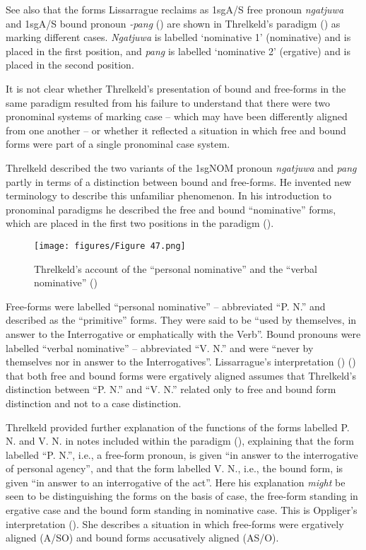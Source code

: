 See also that the forms Lissarrague reclaims as 1sgA/S free pronoun \textit{ngatjuwa} and 1sgA/S bound pronoun \textit{-pang} () are shown in Threlkeld’s paradigm () as marking different cases. \textit{Ngatjuwa} is labelled `nominative 1' (nominative) and is placed in the first position, and \textit{pang} is labelled `nominative 2' (ergative) and is placed in the second position.

It is not clear whether Threlkeld’s presentation of bound and free-forms in the same paradigm resulted from his failure to understand that there were two pronominal systems of marking case – which may have been differently aligned from one another – or whether it reflected a situation in which free and bound forms were part of a single pronominal case system. 



\largerpage
Threlkeld described the two variants of the 1sgNOM pronoun \textit{ngatjuwa} and \textit{pang} partly in terms of a distinction between bound and free-forms. He invented new terminology to describe this unfamiliar phenomenon. In his introduction to pronominal paradigms he described the free and bound “nominative” forms, which are placed in the first two positions in the paradigm ().
\begin{figure}
\texttt{[image: figures/Figure 47.png]}
\caption{\label{fig:3:47} Threlkeld’s account of the “personal nominative” and the “verbal nominative” (\citeyear[18]{threlkeld_australian_1834})}
\end{figure}


Free-forms were labelled ``personal nominative'' – abbreviated ``P. N.'' and described as the ``primitive'' forms. They were said to be ``used by themselves, in answer to the Interrogative or emphatically with the Verb''. Bound pronouns were labelled ``verbal nominative'' – abbreviated ``V. N.'' and were ``never by themselves nor in answer to the Interrogatives''. Lissarrague’s interpretation (\citeyear[39--46]{lissarrague_salvage_2006}) () that both free and bound forms were ergatively aligned assumes that Threlkeld’s distinction between ``P. N.'' and ``V. N.'' related only to free and bound form distinction and not to a case distinction.

Threlkeld provided further explanation of the functions of the forms labelled P. N. and V. N. in notes included within the paradigm (), explaining that the form labelled ``P. N.'', i.e., a free-form pronoun, is given “in answer to the interrogative of personal agency”, and that the form labelled V. N., i.e., the bound form, is given “in answer to an interrogative of the act”. Here his explanation \textit{might} be seen to be distinguishing the forms on the basis of case, the free-form standing in ergative case and the bound form standing in nominative case. This is Oppliger’s interpretation (\citeyear[64--69]{oppliger_phonology_1984}). She describes a situation in which free-forms were ergatively aligned (A/SO) and bound forms accusatively aligned (AS/O).

